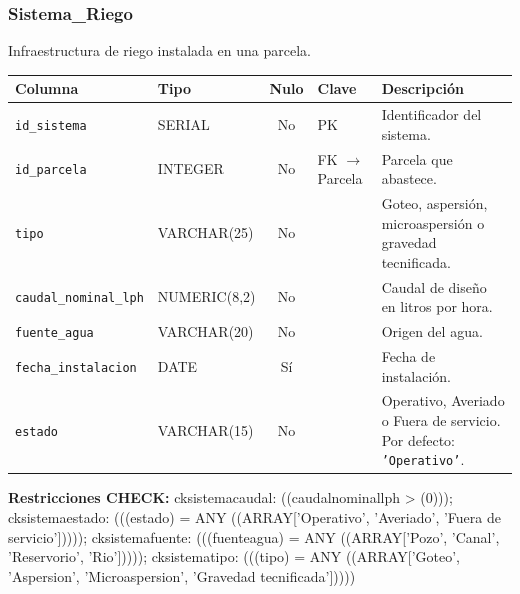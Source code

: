 \documentclass[11pt,letterpaper]{article}
\newcommand{\tbus}{\textunderscore\allowbreak}
\newcommand{\tb}[1]{{\ttfamily\let\_\tbus #1}}
\begin{document}
\subsubsection*{Sistema\_Riego}
Infraestructura de riego instalada en una parcela.
{\footnotesize
\begin{longtable}{>{\raggedright\arraybackslash}p{3.3cm}>{\raggedright\arraybackslash}p{2.5cm}c>{\raggedright\arraybackslash}p{2.2cm}>{\raggedright\arraybackslash}p{6.1cm}}
\toprule
\textbf{Columna} & \textbf{Tipo} & \textbf{Nulo} & \textbf{Clave} & \textbf{Descripción} \\
\midrule
\endhead
\texttt{id\_sistema} & SERIAL & No & PK & Identificador del sistema. \\
\texttt{id\_parcela} & INTEGER & No & FK $\to$ Parcela & Parcela que abastece. \\
\texttt{tipo} & VARCHAR(25) & No &  & Goteo, aspersión, microaspersión o gravedad tecnificada. \\
\texttt{caudal\_nominal\_lph} & NUMERIC(8,2) & No &  & Caudal de diseño en litros por hora. \\
\texttt{fuente\_agua} & VARCHAR(20) & No &  & Origen del agua. \\
\texttt{fecha\_instalacion} & DATE & Sí &  & Fecha de instalación. \\
\texttt{estado} & VARCHAR(15) & No &  & Operativo, Averiado o Fuera de servicio. Por defecto: \texttt{'Operativo'}. \\
\bottomrule
\end{longtable}}
{\footnotesize\textbf{Restricciones CHECK:} \tb{ck\_sistema\_caudal}: \tb{((caudal\_nominal\_lph > (0)))}; \tb{ck\_sistema\_estado}: \tb{(((estado) = ANY ((ARRAY['Operativo', 'Averiado', 'Fuera de servicio']))))}; \tb{ck\_sistema\_fuente}: \tb{(((fuente\_agua) = ANY ((ARRAY['Pozo', 'Canal', 'Reservorio', 'Rio']))))}; \tb{ck\_sistema\_tipo}: \tb{(((tipo) = ANY ((ARRAY['Goteo', 'Aspersion', 'Microaspersion', 'Gravedad tecnificada']))))}\par}
\medskip
\end{document}
